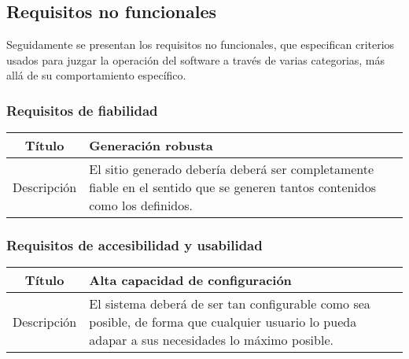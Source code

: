 \subsection{Requisitos no funcionales}

Seguidamente se presentan los requisitos no funcionales, que especifican criterios
usados para juzgar la operación del software a través de varias categorias, más
allá de su comportamiento específico.

\subsubsection{Requisitos de fiabilidad}

\begin{center}

    \begin{tabularx}{\textwidth}{|c|X|}
        \hline
        Título & Generación robusta\\

        \hline

        Descripción & El sitio generado debería deberá ser completamente fiable
        en el sentido que se generen tantos contenidos como los definidos.\\

        \hline
    \end{tabularx}
\end{center}

\subsubsection{Requisitos de accesibilidad y usabilidad}

\begin{center}

    \begin{tabularx}{\textwidth}{|c|X|}
        \hline
        Título & Alta capacidad de configuración\\

        \hline

        Descripción & El sistema deberá de ser tan configurable como sea
        posible, de forma que cualquier usuario lo pueda adapar a sus
        necesidades lo máximo posible.\\

        \hline
    \end{tabularx}
\end{center}

